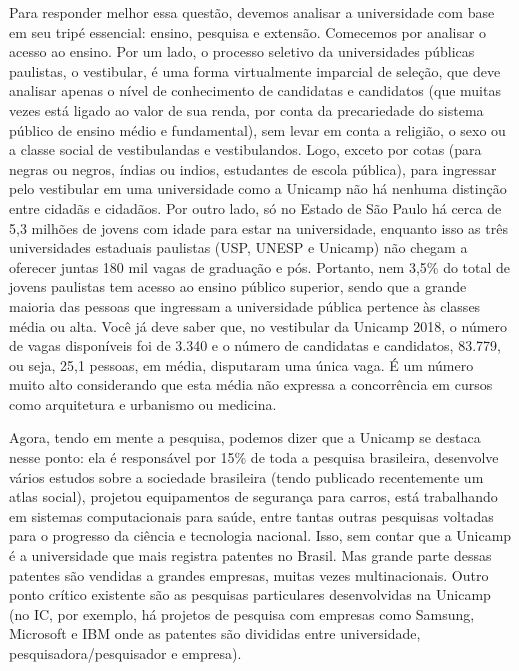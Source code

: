 Para responder melhor essa questão, devemos analisar a universidade com base em
seu tripé essencial: ensino, pesquisa e extensão. Comecemos por analisar o
acesso ao ensino. Por um lado, o processo seletivo da universidades públicas
paulistas, o vestibular, é uma forma virtualmente imparcial de seleção, que
deve analisar apenas o nível de conhecimento de candidatas e candidatos (que
muitas vezes está ligado ao valor de sua renda, por conta da precariedade do
sistema público de ensino médio e fundamental), sem levar em conta a religião,
o sexo ou a classe social de vestibulandas e vestibulandos. Logo, exceto por
cotas (para negras ou negros, índias ou indios, estudantes de escola pública),
para ingressar pelo vestibular em uma universidade como a Unicamp não há
nenhuma distinção entre cidadãs e cidadãos. Por outro lado, só no Estado de
São Paulo há cerca de 5,3 milhões de jovens com idade para estar na
universidade, enquanto isso as três universidades estaduais paulistas (USP,
UNESP e Unicamp) não chegam a oferecer juntas 180 mil vagas de graduação e pós.
Portanto, nem 3,5\% do total de jovens paulistas tem acesso ao ensino público
superior, sendo que a grande maioria das pessoas que ingressam a universidade
pública pertence às classes média ou alta. Você já deve saber que, no
vestibular da Unicamp 2018, o número de vagas disponíveis foi de 3.340 e o
número de candidatas e candidatos, 83.779, ou seja, 25,1 pessoas, em média,
disputaram uma única vaga. É um número muito alto considerando que esta média
não expressa a concorrência em cursos como arquitetura e urbanismo ou medicina.

Agora, tendo em mente a pesquisa, podemos dizer que a Unicamp se destaca nesse
ponto: ela é responsável por 15\% de toda a pesquisa brasileira, desenvolve
vários estudos sobre a sociedade brasileira (tendo publicado recentemente um
atlas social), projetou equipamentos de segurança para carros, está trabalhando
em sistemas computacionais para saúde, entre tantas outras pesquisas voltadas
para o progresso da ciência e tecnologia nacional. Isso, sem contar que a
Unicamp é a universidade que mais registra patentes no Brasil. Mas grande parte
dessas patentes são vendidas a grandes empresas, muitas vezes multinacionais.
Outro ponto crítico existente são as pesquisas particulares desenvolvidas na
Unicamp (no IC, por exemplo, há projetos de pesquisa com empresas como Samsung,
Microsoft e IBM onde as patentes são divididas entre universidade,
pesquisadora/pesquisador e empresa).

